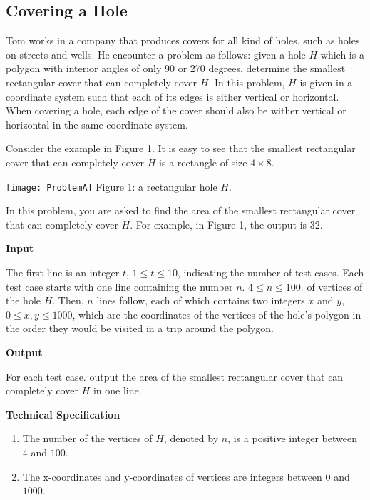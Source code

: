 \graphicspath{{NCPC/NCPC_2018_Preliminary/image/}}
\subsection{Covering a Hole}
Tom works in a company that produces covers for all kind of holes, such as holes on streets and wells. He encounter a problem as follows: given a hole $H$ which is a polygon with interior angles of only 90 or 270 degrees, determine the smallest rectangular cover that can completely cover $H$. In this problem, $H$ is given in a coordinate system such that each of its edges is either vertical or horizontal. When covering a hole, each edge of the cover should also be wither vertical or horizontal in the same coordinate system.

Consider the example in Figure 1. It is easy to see that the smallest rectangular cover that can completely cover $H$ is a rectangle of size $4 \times 8$.

\begin{center}
\texttt{[image: ProblemA]}
Figure 1: a rectangular hole $H$.
\end{center}

In this problem, you are asked to find the area of the smallest rectangular cover that can completely cover $H$. For example, in Figure 1, the output is $32$.

\begin{flushleft}
{\color{red} \textbf{Input}}
\end{flushleft}
The first line is an integer $t$, $1 \leq t \leq 10$, indicating the number of test cases. Each test case starts with one line containing the number $n$. $4 \leq n \leq 100$. of vertices of the hole $H$. Then, $n$ lines follow, each of which contains two integers $x$ and $y$, $0 \leq x, y \leq 1000$, which are the coordinates of the vertices of the hole's polygon in the order they would be visited in a trip around the polygon.

\begin{flushleft}
{\color{red} \textbf{Output}}
\end{flushleft}
For each test case. output the area of the smallest rectangular cover that can completely cover $H$ in one line.

\begin{flushleft}
{\color{red} \textbf{Technical Specification}}
\end{flushleft}
\begin{enumerate}
\item The number of the vertices of $H$, denoted by $n$, is a positive integer between $4$ and $100$.
\item The x-coordinates and y-coordinates of vertices are integers between $0$ and $1000$.
\end{enumerate}

